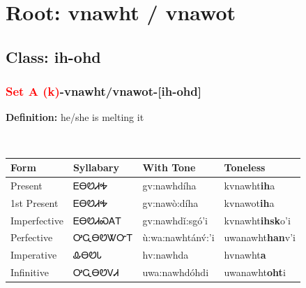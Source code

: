 \needspace{4in}
\section*{Root: vnawht / vnawot}
\nopagebreak
{}
\needspace{3in}
\subsection*{Class: ih-ohd}
\nopagebreak
\needspace{2in}
\subsubsection*{\textcolor{Red}{Set A (k)}{-}\textbf{vnawht/vnawot}{-}[ih-ohd]}
\nopagebreak
\textbf{Definition: } he/she is melting it
\\[0.5em]
\begin{tabularx}{\textwidth}{l X X X}%
\toprule%
\textbf{Form}&\textbf{Syllabary}&\textbf{With Tone}&\textbf{Toneless}\\%
\midrule%
Present&ᎬᎾᏬᏗᎭ&gv:nawhdíha&kvnawht\textbf{ih}a\\%
1st Present&ᎬᎾᏬᏗᎭ&gv:nawò:díha&kvnawot\textbf{ih}a\\%
Imperfective&ᎬᎾᏬᏗᏍᎪᎢ&gv:nawhdǐ:sgó’i&kvnawht\textbf{ihsk}o'i\\%
Perfective&ᎤᏩᎾᏬᏔᏅᎢ&ù:wa:nawhtánv́:’i&uwanawht\textbf{han}v'i\\%
Imperative&ᎲᎾᏬᏓ&hv:nawhda&hvnawht\textbf{a}\\%
Infinitive&ᎤᏩᎾᏬᏙᏗ&uwa:nawhdóhdi&uwanawht\textbf{oht}i\\%
\bottomrule%
\end{tabularx}
\\[1em]